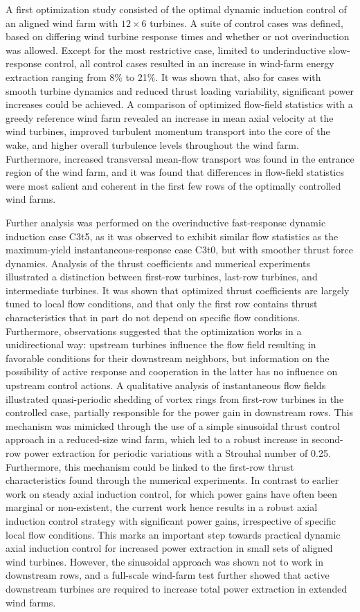 A first optimization study consisted of the optimal dynamic induction control of an aligned wind farm with $12 \times 6$ turbines. 
A suite of control cases was defined, based on differing wind turbine response times and whether or not overinduction was allowed. Except for the most restrictive case, limited to underinductive slow-response control, all control cases resulted in an increase in wind-farm energy extraction ranging from 8$\%$ to 21$\%$. It was shown that, also for cases with smooth turbine dynamics and reduced thrust loading variability, significant power increases could be achieved. A comparison of optimized flow-field statistics with a greedy reference wind farm revealed an increase in mean axial velocity at the wind turbines, improved turbulent momentum transport into the core of the wake, and higher overall turbulence levels throughout the wind farm. Furthermore, increased transversal mean-flow transport was found in the entrance region of the wind farm, and it was found that differences in flow-field statistics were most salient and coherent in the first few rows of the optimally controlled wind farms.

Further analysis was performed on the overinductive fast-response dynamic induction case C3t5, as it was observed to exhibit similar flow statistics as the maximum-yield instantaneous-response case C3t0, but with smoother thrust force dynamics. Analysis of the thrust coefficients and numerical experiments illustrated a distinction between first-row turbines, last-row turbines, and intermediate turbines. It was shown that optimized thrust coefficients are largely tuned to local flow conditions, and that only the first row contains thrust characteristics that in part do not depend on specific flow conditions.  Furthermore, observations suggested that the optimization works in a unidirectional way: upstream turbines influence the flow field resulting in favorable conditions for their downstream neighbors, but information on the possibility of active response and cooperation in the latter has no influence on upstream control actions. A qualitative analysis of instantaneous flow fields illustrated quasi-periodic shedding of vortex rings from first-row turbines in the controlled case, partially responsible for the power gain in downstream rows. This mechanism was mimicked through the use of a simple sinusoidal thrust control approach in a reduced-size wind farm, which led to a robust increase in second-row power extraction for periodic variations with a Strouhal number of 0.25. Furthermore, this mechanism could be linked to the first-row thrust characteristics found through the numerical experiments. In contrast to earlier work on steady axial induction control, for which power gains have often been marginal or non-existent, the current work hence results in a robust axial induction control strategy with significant power gains, irrespective of specific local flow conditions. This marks an important step towards practical dynamic axial induction control for increased power extraction in small sets of aligned wind turbines. However, the sinusoidal approach was shown not to work in downstream rows, and a full-scale wind-farm test further showed that active downstream turbines are required to increase total power extraction in extended wind farms.  

